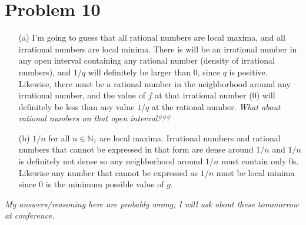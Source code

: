 \documentclass{article}
\newcommand*{\problem}[1]{\section*{Problem #1}}
\begin{document}
\problem{10}
\begin{itemize}
	\item[(a)] I'm going to guess that all rational numbers are local maxima, and all irrational numbers are local minima. There is will be an irrational number in any open interval containing any rational number (density of irrational numbers), and $1/q$ will definitely be larger than $0$, since $q$ is positive. Likewise, there must be a rational number in the neighborhood around any irrational number, and the value of $f$ at that irrational number ($0$) will definitely be less than any value $1/q$ at the rational number. \textit{What about rational numbers on that open interval???}
	\item[(b)] $1/n$ for all $n\in\mathbb{N}_1$ are local maxima. Irrational numbers and rational numbers that cannot be expressed in that form are dense around $1/n$ and $1/n$ is definitely not dense so any neighborhood around $1/n$ must contain only $0$s. Likewise any number that cannot be expressed as $1/n$ must be local minima since $0$ is the minimum possible value of $g$.
\end{itemize}
\textit{My answers/reasoning here are probably wrong; I will ask about these tommorrow at conference.}
\end{document}
